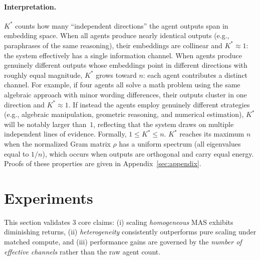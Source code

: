 \documentclass{article}
\theoremstyle{plain}
\theoremstyle{definition}
\theoremstyle{remark}
\begin{document}
\vspace{-0.3cm}

\paragraph{Interpretation.}
$K^*$ counts how many ``independent directions'' the agent outputs span in embedding space.
When all agents produce nearly identical outputs (e.g., paraphrases of the same reasoning), their embeddings are collinear and $K^* \approx 1$: the system effectively has a single information channel.
When agents produce genuinely different outputs whose embeddings point in different directions with roughly equal magnitude, $K^*$ grows toward $n$: each agent contributes a distinct channel.
For example, if four agents all solve a math problem using the same algebraic approach with minor wording differences, their outputs cluster in one direction and $K^*\approx 1$. If instead the agents employ genuinely different strategies (e.g., algebraic manipulation, geometric reasoning, and numerical estimation), $K^*$ will be notably larger than~$1$, reflecting that the system draws on multiple independent lines of evidence.
Formally, $1\le K^*\le n$. $K^*$ reaches its maximum $n$ when the normalized Gram matrix $\rho$ has a uniform spectrum (all eigenvalues equal to $1/n$), which occurs when outputs are orthogonal and carry equal energy.
Proofs of these properties are given in Appendix~\ref{sec:appendix}.







\section{Experiments}
\label{sec:experiment}
This section validates 3 core claims:  
(i) scaling \emph{homogeneous} MAS exhibits diminishing returns,  
(ii) \emph{heterogeneity} consistently outperforms pure scaling under matched compute,  
and (iii) performance gains are governed by the \emph{number of effective channels} rather than the raw agent count.
\end{document}
